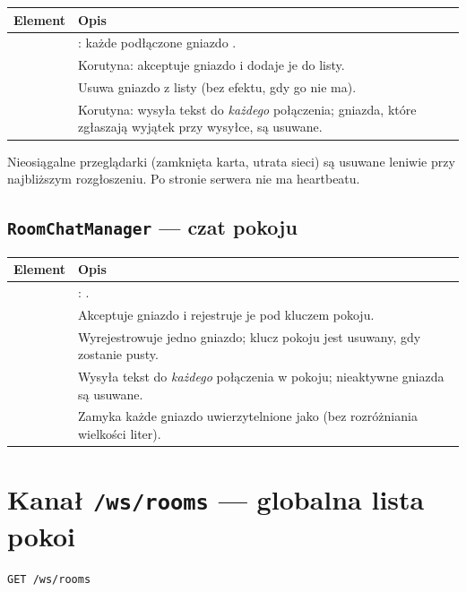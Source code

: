 \begin{tabularx}{\textwidth}{lY}
\toprule
Element & Opis \\
\midrule
{} & : każde podłączone gniazdo . \\
 & Korutyna: akceptuje gniazdo i dodaje je do listy. \\
 & Usuwa gniazdo z listy (bez efektu, gdy go nie ma). \\
 & Korutyna: wysyła tekst do \emph{każdego} połączenia; gniazda, które zgłaszają wyjątek przy wysyłce, są usuwane. \\
\bottomrule
\end{tabularx}

Nieosiągalne przeglądarki (zamknięta karta, utrata sieci) są usuwane leniwie przy najbliższym
rozgłoszeniu. Po stronie serwera nie ma heartbeatu.

\subsection{\texttt{RoomChatManager} --- czat pokoju}

\begin{tabularx}{\textwidth}{lY}
\toprule
Element & Opis \\
\midrule
{} & : . \\
 & Akceptuje gniazdo i rejestruje je pod kluczem pokoju. \\
 & Wyrejestrowuje jedno gniazdo; klucz pokoju jest usuwany, gdy zostanie pusty. \\
 & Wysyła tekst do \emph{każdego} połączenia w pokoju; nieaktywne gniazda są usuwane. \\
 & Zamyka każde gniazdo uwierzytelnione jako  (bez rozróżniania wielkości liter). \\
\bottomrule
\end{tabularx}

\section{Kanał \texttt{/ws/rooms} --- globalna lista pokoi}
\label{sec:rt-rooms}

\begin{lstlisting}
GET /ws/rooms
\end{lstlisting}

